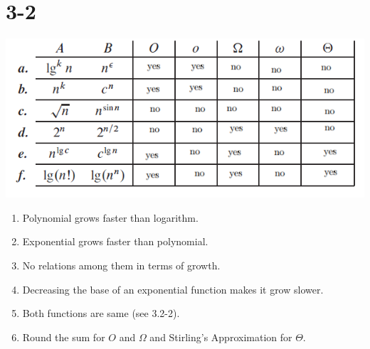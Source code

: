 \documentclass[12pt]{article}
\begin{document}
\section{3-2}
\includegraphics{3-2.png}

\begin{enumerate}[label=\alph*]

\item Polynomial grows faster than logarithm. \newline
\item Exponential grows faster than polynomial. \newline
\item No relations among them in terms of growth. \newline
\item Decreasing the base of an exponential function makes it grow slower. \newline
\item Both functions are same (see 3.2-2). \newline
\item Round the sum for $O$ and $\Omega$ and Stirling's Approximation for $\Theta$.

\end{enumerate}
\end{document}
